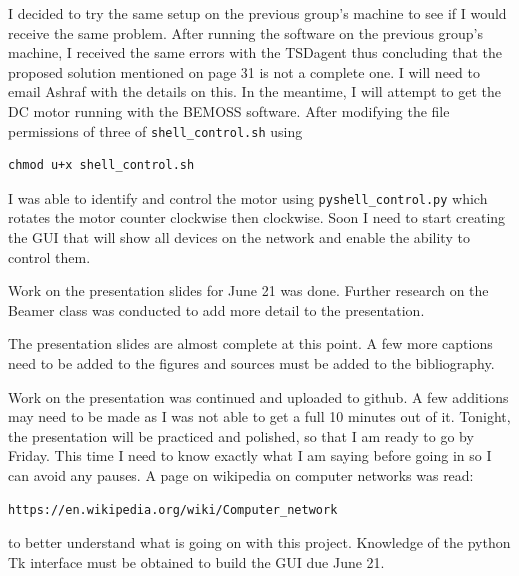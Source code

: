 \documentclass[fontsize=11pt, %
                             paper=letter, %
                             twoside, %
                             captions=tableheading,
                             index=totoc,
                             hyperref]{labbook}
\begin{document}
\begin{addmargin}[0cm]{0cm}
I decided to try the same setup on the previous group's machine to see if I would receive the same problem. After running the software on the previous group's machine, I received the same errors with the TSDagent thus concluding that the proposed solution mentioned on page 31 is not a complete one. I will need to email Ashraf with the details on this. 
\bigbreak\noindent
In the meantime, I will attempt to get the DC motor running with the BEMOSS software. After modifying the file permissions of three of \texttt{shell\_control.sh} using
\begin{verbatim}
chmod u+x shell_control.sh
\end{verbatim}
I was able to identify and control the motor using \texttt{pyshell\_control.py} which rotates the motor counter clockwise then clockwise. Soon I need to start creating the GUI that will show all devices on the network and enable the ability to control them.

Work on the presentation slides for June 21 was done. Further research on the Beamer class was conducted to add more detail to the presentation.

The presentation slides are almost complete at this point. A few more captions need to be added to the figures and sources must be added to the bibliography.

Work on the presentation was continued and uploaded to github. A few additions may need to be made as I was not able to get a full 10 minutes out of it. Tonight, the presentation will be practiced  and polished, so that I am ready to go by Friday. This time I need to know exactly what I am saying before going in so I can avoid any pauses.
\bigbreak\noindent
A page on wikipedia on computer networks was read:
\begin{verbatim}
https://en.wikipedia.org/wiki/Computer_network
\end{verbatim}
to better understand what is going on with this project. Knowledge of the python Tk interface must be obtained to build the GUI due June 21.



\end{addmargin}
\end{document}
